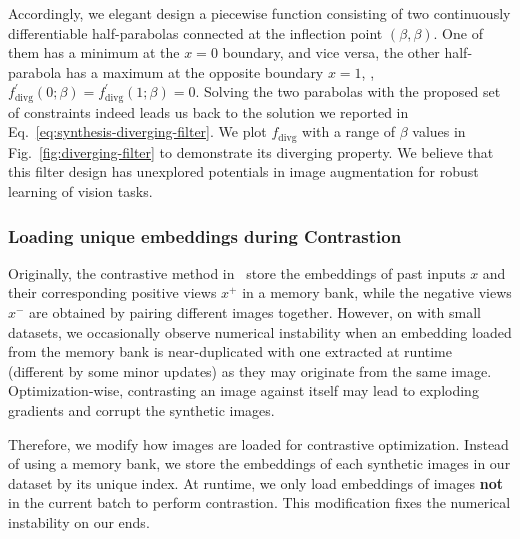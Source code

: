 \begin{foldable} %
    Accordingly, we elegant design a piecewise function consisting of two continuously differentiable half-parabolas connected at the inflection point $\left(\beta,\beta\right)$.
    One of them has a minimum at the $x=0$ boundary, and vice versa, the other half-parabola has a maximum at the opposite boundary $x=1$, \ie, $f_{\text{divg}}^{\prime}(0;\beta)=f_{\text{divg}}^{\prime}(1;\beta)=0$.
    Solving the two parabolas with the proposed set of constraints indeed leads us back to the solution we reported in Eq.~\ref{eq:synthesis-diverging-filter}.
    We plot $f_{\text{divg}}$ with a range of $\beta$ values in Fig.~\ref{fig:diverging-filter} to demonstrate its diverging property.
    We believe that this filter design has unexplored potentials in image augmentation for robust learning of vision tasks.
\end{foldable}



\subsubsection{Loading unique embeddings during Contrastion} \label{sssec:app01-teacherstudents-optimization-uniqueembeddings}
\begin{foldable} %
    Originally, the contrastive method in~\cite{fang2021contrastive} store the embeddings of past inputs $x$ and their corresponding positive views $x^{+}$ in a memory bank, while the negative views $x^{-}$ are obtained by pairing different images together.
    However, on with small datasets, we occasionally observe numerical instability when an embedding loaded from the memory bank is near-duplicated with one extracted at runtime (different by some minor updates) as they may originate from the same image.
    Optimization-wise, contrasting an image against itself may lead to exploding gradients and corrupt the synthetic images.
\end{foldable}

\begin{foldable} %
    Therefore, we modify how images are loaded for contrastive optimization.
    Instead of using a memory bank, we store the embeddings of each synthetic images in our dataset by its unique index.
    At runtime, we only load embeddings of images \textbf{not} in the current batch to perform contrastion.
    This modification fixes the numerical instability on our ends.
\end{foldable}


